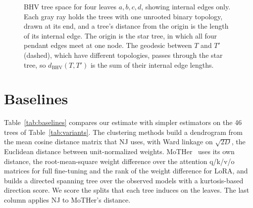 \documentclass{article}
\theoremstyle{definition}
\theoremstyle{plain}
\newif\ifrevision
\newcommand{\rev}[1]{\ifrevision{\color{blue}#1}\else#1\fi}
\newcommand{\revcolor}{\ifrevision\color{blue}\fi}
\newcommand{\revtag}[1]{\ifrevision\textsuperscript{\color{blue}\sffamily\scriptsize[#1]}\fi}
\begin{document}
\begin{figure}[h]
\centering
{}
\caption{\rev{BHV tree space for four leaves $a,b,c,d$, showing internal edges only. Each gray ray holds the trees with one unrooted binary topology, drawn at its end, and a tree's distance from the origin is the length of its internal edge. The origin is the star tree, in which all four pendant edges meet at one node. The geodesic between $T$ and $T'$ (dashed), which have different topologies, passes through the star tree, so $d_{\mathrm{BHV}}(T,T')$ is the sum of their internal edge lengths.}\revtag{FgwB W1}}
\label{fig:bhv}
\end{figure}

\section{\rev{Baselines}}
\label{app:baselines}
{\revcolor
\revtag{tWEn W3; S8sV Q1}Table~\ref{tab:baselines} compares our estimate with simpler estimators on the 46 trees of Table~\ref{tab:variants}. The clustering methods build a dendrogram from the mean cosine distance matrix that NJ uses, with Ward linkage on $\sqrt{2D}$, the Euclidean distance between unit-normalized weights. MoTHer~\citep{horwitz2025mother} uses its own distance, the root-mean-square weight difference over the attention q/k/v/o matrices for full fine-tuning and the rank of the weight difference for LoRA, and builds a directed spanning tree over the observed models with a kurtosis-based direction score. We score the splits that each tree induces on the leaves. The last column applies NJ to MoTHer's distance.
}
\end{document}
